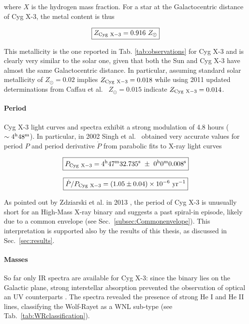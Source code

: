 \documentclass[a4paper,titlepage]{book}     	%
\newcommand{\sun}{\ensuremath{_\odot}}
\newcommand{\zsun}{\ensuremath{Z\sun}}
\newcommand{\yr}{\text{yr}}
\begin{document}
where $X$ is the hydrogen mass fraction. For a star at the Galactocentric distance of Cyg X-3, the metal content is thus

\begin{equation}\label{eq:CygX3metallicity}
    \boxed{Z_{\rm Cyg~X-3} = 0.916~\zsun}
\end{equation}

This metallicity is the one reported in Tab. \ref{tab:observations} for Cyg X-3 and is clearly very similar to the solar one, given that both the Sun and Cyg X-3 have almost the same Galactocentric distance. In particular, assuming standard solar metallicity of $\zsun =0.02$ implies $Z_{\rm Cyg~X-3} = 0.018$ while using 2011 updated determinations from Caffau et al.\ \cite{caffau2011solarmetallicity} $\zsun=0.015$ indicate $Z_{\rm Cyg~X-3}=0.014$.


\paragraph{Period} Cyg X-3 light curves and spectra exhibit a strong modulation of 4.8 hours ($\sim 4^{\rm h} 48^{\rm m}$). In particular, in 2002 Singh et al.\ \cite{CygX-3_Singh2002} obtained very accurate values for period $P$ and period derivative $\dot{P}$ from parabolic fits to X-ray light curves

\begin{equation}\label{eq:periodCygX3}
    \boxed{P_{\rm Cyg~X-3} = 4^{\rm h} 47^{\rm m} 32.735^{\rm s}~\pm~0^{\rm h} 0^{\rm m} 0.008^{\rm s}}
\end{equation}

\begin{equation}\label{eq:pdotCygX3}
    \boxed{\dot{P}/P_{\rm Cyg~X-3} = (1.05 \pm 0.04) \times 10^{-6}~\yr^{-1}}
\end{equation}

As pointed out by Zdziarski et al. in 2013 \cite{Cyg-X3_Zd2013}, the period of Cyg X-3 is unusually short for an High-Mass X-ray binary and suggests a past spiral-in episode, likely due to a common envelope (see Sec.\ \ref{subsec:Commonenvelope}). This interpretation is supported also by the results of this thesis, as discussed in Sec.\ \ref{sec:results}.

\paragraph{Masses} So far only IR spectra are available for Cyg X-3: since the binary lies on the Galactic plane, strong interstellar absorption prevented the observation of optical an UV counterparts \cite{CygX-3_Koljonen2017}. The spectra revealed the presence of strong He I and He II lines, classifying the Wolf-Rayet as a WNL sub-type (see Tab.\ \ref{tab:WRclassification}).\\
\end{document}
